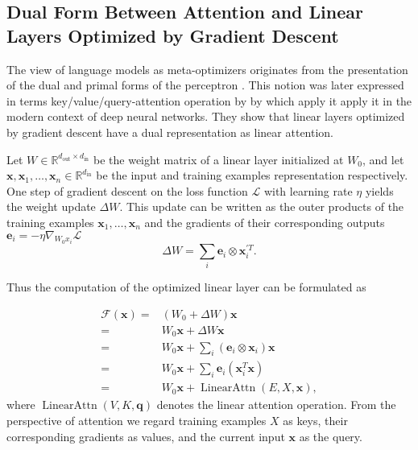 \subsection{Dual Form Between Attention and Linear Layers Optimized by Gradient Descent}

The view of language models as meta-optimizers originates from the presentation of the dual and primal forms of the perceptron \cite{Aizerman2019TheoreticalFO}.
This notion was later expressed in terms key/value/query-attention operation by by \cite{irie22dual,dai2023gpt,pmlr-v202-von-oswald23a} which apply it apply it in the modern context of deep neural networks.
They show that linear layers optimized by gradient descent have a dual representation as linear attention.

Let $W \in \mathbb{R}^{d_{\text{out}} \times d_{\text{in}}}$ be the weight matrix of a linear layer initialized at $W_0$, and let $\mathbf{x}, \mathbf{x}_1, \dots, \mathbf{x}_n  \in \mathbb{R}^{d_{\text{in}}}$ be the input and training examples representation respectively.
One step of gradient descent on the loss function $\mathcal{L}$ with learning rate $\eta$ yields the weight update $\Delta W$.
This update can be written as the outer products of the training examples $\mathbf{x}_1, \dots, \mathbf{x}_n$ and the gradients of their corresponding outputs $\mathbf{e}_i = -\eta \nabla_{W_0 x_i}\mathcal{L}$
\begin{equation}
    \Delta W = \sum_i \mathbf{e}_i \otimes \mathbf{x}^{\prime T}_i.
    \label{equ:dual_comp_2}
\end{equation}

Thus the computation of the optimized linear layer can be formulated as 

\begin{equation}
    \begin{aligned}
        \mathcal{F}(\mathbf{x}) = & \left( W_{0} + \Delta W \right) \mathbf{x} \\
        = & W_{0} \mathbf{x} + \Delta W \mathbf{x} \\
        = & W_{0} \mathbf{x} + \sum_i \left( \mathbf{e}_i \otimes \mathbf{x}_i\right) \mathbf{x} \\
        = & W_{0} \mathbf{x} + \sum_i \mathbf{e}_i \left( \mathbf{x}^{T}_i \mathbf{x} \right) \\
        = & W_{0} \mathbf{x} + \operatorname{LinearAttn} \left( E, X, \mathbf{x} \right), 
    \end{aligned}
    \label{equ:sgd_attn_dual}
\end{equation}
where $\operatorname{LinearAttn}(V, K, \mathbf{q})$ denotes the linear attention operation.
From the perspective of attention we regard training examples $X$ as keys, their corresponding gradients as values, and the current input $\mathbf{x}$ as the query.


